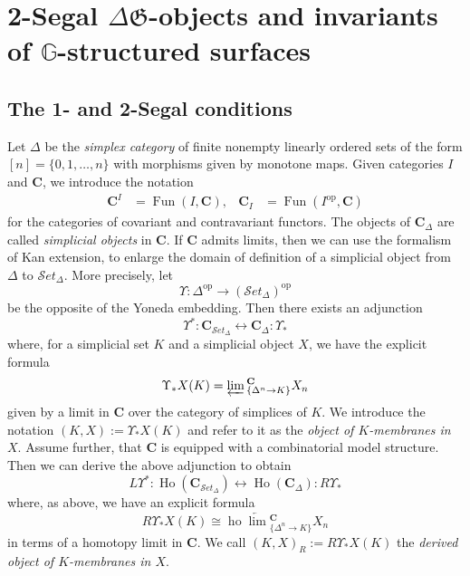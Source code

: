 \documentclass[english,11pt,leqno]{article}
\def\GG{\mathbb{G}}
\def\Gen{\mathfrak{G}}
\def\Cb{\mathbf{C}}
\def\Ho{\operatorname{Ho}}
\def\pro{\varprojlim{}}
\def\hopro{\operatorname{ho}\!\varprojlim{}}
\def\op{{\operatorname{op}}}
\def\Fun{\operatorname{Fun}}
\def\ho{\operatorname{ho}\!}
\def\hopro{\ho \underleftarrow{\lim}{}}
\def\Set{ {\mathcal Set}}
\def\Set{ {\mathcal Set}}
\theoremstyle{definition}
\theoremstyle{remark}
\numberwithin{equation}{section}
\begin{document}
 
 
 
 
 
 
 
 
 
 
 
 
 
 
 
 
 
 
 
 
  


\newpage
\section{2-Segal $\Delta\Gen$-objects and invariants of $\GG$-structured surfaces}
   
\subsection{The 1- and 2-Segal conditions}\label{subset:simplicial-cyclic}

Let $\Delta$ be the {\em simplex category} of finite nonempty linearly ordered sets of the form $[n] = \{0,1,\dots,n\}$ with
morphisms given by monotone maps. Given categories $I$ and $\Cb$, we introduce the notation
\begin{align*}
	\Cb^I & = \Fun(I, \Cb), & \Cb_I & = \Fun(I^{\op}, \Cb)
\end{align*}
for the categories of covariant and contravariant functors.
The objects of $\Cb_{\Delta}$ are called {\em simplicial objects} in $\Cb$. 
If $\Cb$ admits limits, then we can use the formalism of Kan extension, to enlarge the domain of
definition of a simplicial object from $\Delta$ to $\Set_{\Delta}$. More precisely, let 
\[
	\Upsilon: \Delta^{\op} \to (\Set_{\Delta})^{\op}
\]
be the opposite of the Yoneda embedding. Then there exists an adjunction
\[
	\Upsilon^*: \Cb_{\Set_\Delta} \longleftrightarrow \Cb_{\Delta} : \Upsilon_*
\]
where, for a simplicial set $K$ and a simplicial object $X$, we have the explicit formula
\[
	\Upsilon_* X (K) = \pro_{\{\Delta^n \to K\}}^{\Cb} X_n
\]
given by a limit in $\Cb$ over the category of simplices of $K$. We introduce the notation
$(K,X) := \Upsilon_* X (K)$ and refer to it as the {\em object of $K$-membranes in $X$}.
Assume further, that $\Cb$ is equipped with a combinatorial model structure. Then we can derive the
above adjunction to obtain
\[
	L\Upsilon^*: \Ho(\Cb_{\Set_\Delta}) \longleftrightarrow \Ho(\Cb_{\Delta}): R \Upsilon_*
\]
where, as above, we have an explicit formula 
\[
	R \Upsilon_* X(K) \cong \hopro_{\{\Delta^n \to K\}}^{\Cb} X_n
\]
in terms of a homotopy limit in $\Cb$. We call $(K,X)_R := R \Upsilon_* X(K)$ the {\em derived
object of $K$-membranes in $X$}.
\end{document}
